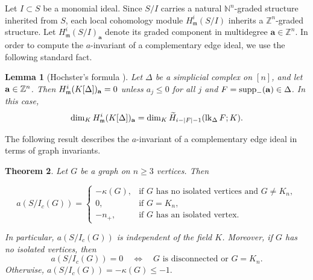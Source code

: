 \documentclass[12pt]{amsart}
\newtheorem{Theorem}{Theorem}[section]
\newtheorem{Lemma}[Theorem]{Lemma}
\begin{document}
Let $I \subset S$ be a monomial ideal. Since $S/I$ carries a natural $\mathbb{N}^n$-graded structure inherited from $S$, each local cohomology module $H^i_{\mathfrak{m}}(S/I)$ inherits a $\mathbb{Z}^n$-graded structure. Let $H^i_{\mathfrak{m}}(S/I)_{\mathbf{a}}$ denote its graded component in multidegree $\mathbf{a} \in \mathbb{Z}^n$.
In order to compute the $a$-invariant of a complementary edge ideal, we use the following standard fact.

\begin{Lemma}
[Hochster's formula {\cite[Theorem~5.3.8]{BH}}]
\label{lem:hochster}
Let $\Delta$ be a simplicial complex on $[n]$, and let
${\bf a}\in\mathbb Z^n$.
Then $H^i_{\mathfrak m}(K[\Delta])_{\bf a}=0$ unless
$a_j\leq 0$ for all $j$ and
$F=\operatorname{supp}_-({\bf a})\in\Delta$.
In this case,
\[
\dim_K H^i_{\mathfrak m}(K[\Delta])_{\bf a}
=
\dim_K\widetilde H_{i-|F|-1}
(\operatorname{lk}_\Delta F;K).
\]
\end{Lemma}

The following result describes the $a$-invariant of a complementary edge ideal in terms of graph invariants.

\begin{Theorem}\label{thm:ainv}
Let $G$ be a graph on $n\geq 3$ vertices. Then

$$
a(S/I_c(G))=
\begin{cases}
-\kappa(G), & \text{if $G$ has no isolated vertices and }G\neq K_n,\\[2mm]
0, & \text{if }G=K_n,\\[2mm]
-n_+, & \text{if $G$ has an isolated vertex}.
\end{cases}
$$

In particular, $a(S/I_c(G))$ is independent of the field $K$. Moreover, if $G$ has no isolated vertices, then
$$
a(S/I_c(G))=0
\quad\Longleftrightarrow\quad
G\text{ is disconnected or }G=K_n.
$$
Otherwise, $a(S/I_c(G))=-\kappa(G)\le -1.$
\end{Theorem}
\end{document}
